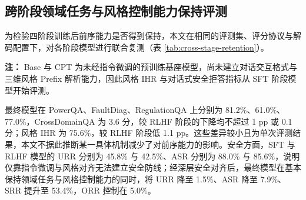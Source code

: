\documentclass[fontset=fandol,type=master,campus=shenzhen,etitleauto=true]{hithesisbook}
\begin{document}
\subsection{跨阶段领域任务与风格控制能力保持评测}\label{cross-stage-retention}

为检验四阶段训练后前序能力是否得到保持，本文在相同的评测集、评分协议与解码配置下，对各阶段模型进行联合复测（表 \ref{tab:cross-stage-retention}）。

\begin{table}[htbp]
\centering
\caption{四阶段模型的领域任务、风格控制与安全合规联合评测矩阵}
\label{tab:cross-stage-retention}
\small
\setlength{\tabcolsep}{3.5pt}
\renewcommand{\arraystretch}{1.15}

\vspace{0.2cm}
{\small \textbf{注：} Base 与 CPT 为未经指令微调的预训练基座模型，尚未建立对话交互格式与三维风格 Prefix 解析能力，因此风格 IHR 与对话式安全拒答指标从 SFT 阶段模型开始评测。}
\end{table}

最终模型在 PowerQA、FaultDiag、RegulationQA 上分别为 81.2\%、61.0\%、77.0\%，CrossDomainQA 为 3.6 分，较 RLHF 阶段的下降均不超过 1 pp 或 0.1 分；风格 IHR 为 75.6\%，较 RLHF 阶段低 1.1 pp。这些差异较小且为单次评测结果，本文不据此推断某一具体机制减少了对前序能力的影响。安全方面，SFT 与 RLHF 模型的 URR 分别为 45.8\% 与 42.5\%、ASR 分别为 88.0\% 与 85.6\%，说明仅靠指令微调与风格对齐无法建立安全防线；经深层安全对齐后，最终模型在基本保持领域任务与风格控制能力的同时，将 URR 降至 1.5\%、ASR 降至 7.9\%、SRR 提升至 53.4\%，ORR 控制在 5.0\%。
\end{document}
